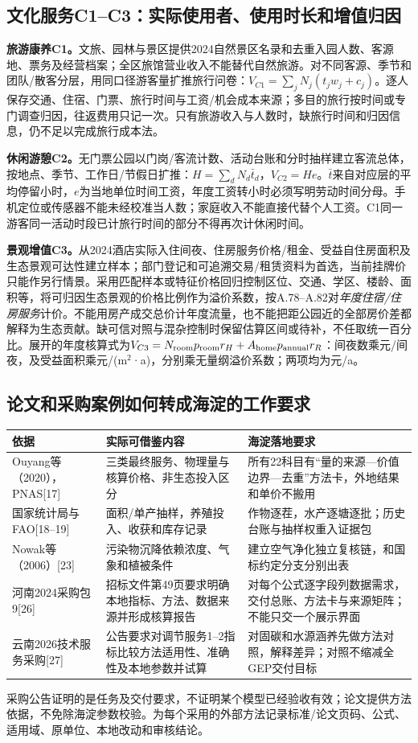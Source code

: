 \documentclass[12pt,a4paper,fontset=fandol]{ctexart}
\begin{document}
\subsection{文化服务C1--C3：实际使用者、使用时长和增值归因}
\textbf{旅游康养C1。}文旅、园林与景区提供2024自然景区名录和去重入园人数、客源地、票务及经营档案；全区旅馆营业收入不能替代自然旅游。对不同客源、季节和团队/散客分层，用同口径游客量扩推旅行问卷：$V_{C1}=\sum_jN_j(t_jw_j+c_j)$。逐人保存交通、住宿、门票、旅行时间与工资/机会成本来源；多目的旅行按时间或专门调查归因，往返费用只记一次。只有旅游收入与人数时，缺旅行时间和归因信息，仍不足以完成旅行成本法。

\textbf{休闲游憩C2。}无门票公园以门岗/客流计数、活动台账和分时抽样建立客流总体，按地点、季节、工作日/节假日扩推：$H=\sum_dN_d\bar t_d$，$V_{C2}=He$。$\bar t$来自对应层的平均停留小时，$e$为当地单位时间工资，年度工资转小时必须写明劳动时间分母。手机定位或传感器不能未经校准当人数；家庭收入不能直接代替个人工资。C1同一游客同一活动时段已计旅行时间的部分不得再次计休闲时间。

\textbf{景观增值C3。}从2024酒店实际入住间夜、住房服务价格/租金、受益自住房面积及生态景观可达性建立样本；部门登记和可追溯交易/租赁资料为首选，当前挂牌价只能作另行情景。采用匹配样本或特征价格回归控制区位、交通、学区、楼龄、面积等，将可归因生态景观的价格比例作为溢价系数，按A.78--A.82对\emph{年度住宿/住房服务}计价。不能用房产成交总价计年度流量，也不能把距公园近的全部房价差都解释为生态贡献。缺可信对照与混杂控制时保留估算区间或待补，不任取统一百分比。展开的年度核算式为$V_{C3}=N_{\rm room}p_{\rm room}r_H+A_{\rm home}p_{\rm annual}r_R$：间夜数乘元/间夜，及受益面积乘元/(m$^2$·a)，分别乘无量纲溢价系数；两项均为元/a。

\subsection{论文和采购案例如何转成海淀的工作要求}
\begin{longtable}{P{3.3cm}P{5cm}P{4.9cm}}
\toprule 依据 & 实际可借鉴内容 & 海淀落地要求 \\\midrule\endhead
Ouyang等（2020），PNAS[17] & 三类最终服务、物理量与核算价格、非生态投入区分 & 所有22科目有“量的来源—价值边界—去重”方法卡，外地结果和单价不搬用 \\
国家统计局与FAO[18--19] & 面积/单产抽样，养殖投入、收获和库存记录 & 作物逐茬，水产逐塘逐批；历史台账与抽样权重入证据包 \\
Nowak等（2006）[23] & 污染物沉降依赖浓度、气象和植被条件 & 建立空气净化独立复核链，和国标约定分支分别出表 \\
河南2024采购包9[26] & 招标文件第49页要求明确本地指标、方法、数据来源并形成核算报告 & 对每个公式逐字段列数据需求，交付总账、方法卡与来源矩阵；不能只交一个展示界面 \\
云南2026技术服务采购[27] & 公告要求对调节服务1--2指标比较方法适用性、准确性及本地参数并试算 & 对固碳和水源涵养先做方法对照，解释差异；对照不缩减全GEP交付目标 \\
\bottomrule
\end{longtable}
采购公告证明的是任务及交付要求，不证明某个模型已经验收有效；论文提供方法依据，不免除海淀参数校验。为每个采用的外部方法记录标准/论文页码、公式、适用域、原单位、本地改动和审核结论。
\end{document}
